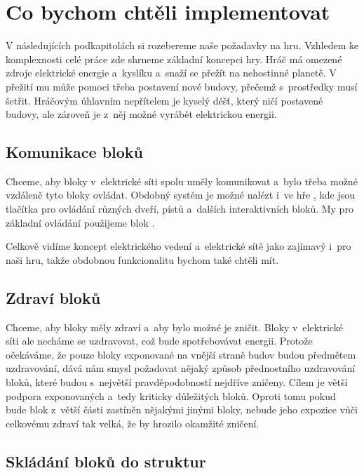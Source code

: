 


\section{Co bychom chtěli implementovat}

V následujících podkapitolách si rozebereme naše požadavky na hru. Vzhledem ke komplexnosti celé práce zde shrneme základní koncepci hry. Hráč má omezené zdroje elektrické energie a~kyslíku a~snaží se přežít na nehostinné planetě. V přežití mu může pomoci třeba postavení nové budovy, přečemž s~prostředky musí šetřit. Hráčovým úhlavním nepřítelem je kyselý déšť, který ničí postavené budovy, ale zároveň je z~něj možné vyrábět elektrickou energii. 







\subsection{Komunikace bloků}

Chceme, aby bloky v~elektrické síti spolu uměly komunikovat a~bylo třeba možné vzdáleně tyto bloky ovládat. Obdobný systém je možné nalézt i~ve hře \SE{}, kde jsou tlačítka pro ovládání různých dveří, pístů a~dalších interaktivních bloků. My pro základní ovládání použijeme blok .


Celkově vidíme koncept elektrického vedení a~elektrické sítě jako zajímavý i~pro naši hru, takže obdobnou funkcionalitu bychom také chtěli mít.



\subsection{Zdraví bloků}
Chceme, aby bloky měly zdraví a~aby bylo možné je zničit. Bloky v~elektrické síti ale necháme se uzdravovat, což bude spotřebovávat energii. Protože očekáváme, že pouze bloky exponované na vnější straně budov budou předmětem uzdravování, dává nám smysl požadovat nějaký způsob přednostního uzdravování bloků, které budou s~největší pravděpodobností nejdříve zničeny. Cílem je větší podpora exponovaných a~tedy kriticky důležitých bloků. Oproti tomu pokud bude blok z~větší části zastíněn nějakými jinými bloky, nebude jeho expozice vůči celkovému zdraví tak velká, že by hrozilo okamžité zničení.

\subsection{Skládání bloků do struktur}


